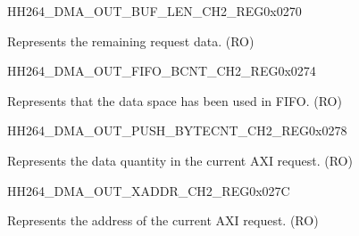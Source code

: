     \begin{register}{H}{H264\_DMA\_OUT\_BUF\_LEN\_CH2\_REG}{0x0270}\label{regdesc:H264DMAOUTBUFLENCH2REG}
    \regnewline%
    \begin{regdesc}\begin{reglist}
    \label{fielddesc:H264DMAOUTCMDFIFOBUFLENHBCH2}\item [H264\_DMA\_OUT\_CMDFIFO\_BUF\_LEN\_HB\_CH2] Represents the remaining request data. (RO)
    \end{reglist}\end{regdesc}
    \end{register}
    
    
    \begin{register}{H}{H264\_DMA\_OUT\_FIFO\_BCNT\_CH2\_REG}{0x0274}\label{regdesc:H264DMAOUTFIFOBCNTCH2REG}
    \regnewline%
    \begin{regdesc}\begin{reglist}
    \label{fielddesc:H264DMAOUTCMDFIFOOUTFIFOBCNTCH2}\item [H264\_DMA\_OUT\_CMDFIFO\_OUTFIFO\_BCNT\_CH2] Represents that the data space has been used in FIFO. (RO)
    \end{reglist}\end{regdesc}
    \end{register}
    
    
    \begin{register}{H}{H264\_DMA\_OUT\_PUSH\_BYTECNT\_CH2\_REG}{0x0278}\label{regdesc:H264DMAOUTPUSHBYTECNTCH2REG}
    \regnewline%
    \begin{regdesc}\begin{reglist}
    \label{fielddesc:H264DMAOUTCMDFIFOPUSHBYTECNTCH2}\item [H264\_DMA\_OUT\_CMDFIFO\_PUSH\_BYTECNT\_CH2] Represents the data quantity in the current AXI request. (RO)
    \end{reglist}\end{regdesc}
    \end{register}
    
    
    \begin{register}{H}{H264\_DMA\_OUT\_XADDR\_CH2\_REG}{0x027C}\label{regdesc:H264DMAOUTXADDRCH2REG}
    \regnewline%
    \begin{regdesc}\begin{reglist}
    \label{fielddesc:H264DMAOUTCMDFIFOXADDRCH2}\item [H264\_DMA\_OUT\_CMDFIFO\_XADDR\_CH2] Represents the address of the current AXI request. (RO)
    \end{reglist}\end{regdesc}
    \end{register}
    
